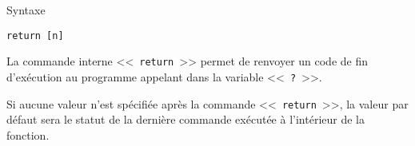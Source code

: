 \begin{definition}{Syntaxe}
\begin{verbatim}
return [n]
\end{verbatim}
\end{definition}

La commande interne <<~\texttt{return}~>> permet de renvoyer un code de fin d'ex{\'e}cution au programme
appelant dans la variable <<~\texttt{?}~>>.

Si aucune valeur n'est sp{\'e}cifi{\'e}e apr{\`e}s la commande <<~\texttt{return}~>>, la valeur par d{\'e}faut sera le
statut de la derni{\`e}re commande ex{\'e}cut{\'e}e {\`a} l'int{\'e}rieur de la fonction.

